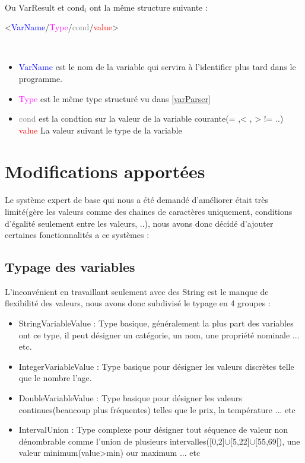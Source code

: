 \paragraph{}Ou VarResult et cond$_i$ ont la même structure suivante : \\

\begin{minipage}{\textwidth}
	\centering
	\Large{<\textcolor{blue}{VarName}/\textcolor{Magenta}{Type}/\textcolor{gray}{cond}/\textcolor{red}{value}>}
\end{minipage}
\\
\begin{itemize}[label=\textbullet, font=\color{black}]
	\item \textcolor{blue}{VarName} est le nom de la variable qui servira à l'identifier plus tard dans le programme.
	\item \textcolor{Magenta}{Type} est le même type structuré vu dans \ref{varParser}
	\item \textcolor{gray}{cond} est la condtion sur la valeur de la variable courante(= ,< , > != ..)
	\textcolor{red}{value} La valeur suivant le type de la variable
\end{itemize}
\section{Modifications apportées}
\paragraph{}
Le système expert de base qui nous a été demandé d'améliorer était très limité(gère les valeurs comme des chaines de caractères uniquement, conditions d'égalité seulement entre les valeurs, ..), nous avons donc décidé d'ajouter certaines fonctionnalités a ce systèmes : \\
\subsection{Typage des variables}
L'inconvénient en travaillant seulement avec des String est le manque de flexibilité des valeurs, nous avons donc subdivisé le typage en 4 groupes : \\
\begin{itemize}[label=\textbullet, font=\color{black}]
	\item StringVariableValue : Type basique, généralement la plus part des variables ont ce type, il peut désigner un catégorie, un nom, une propriété nominale ... etc.
	\item IntegerVariableValue : Type basique pour désigner les valeurs discrètes telle que le nombre l'age.
	\item DoubleVariableValue : Type basique pour désigner les valeurs continues(beaucoup plus fréquentes) telles que le prix, la température ... etc
	\item IntervalUnion : Type complexe pour désigner tout séquence de valeur non dénombrable comme l'union de plusieurs intervalles([0,2]$\cup$[5,22]$\cup$[55,69[), une valeur minimum(value>min) our maximum ... etc
\end{itemize}

